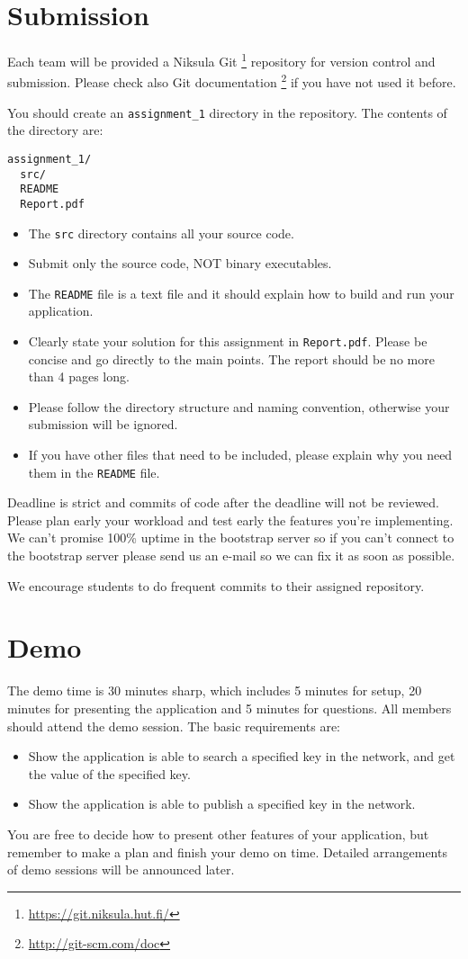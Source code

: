 \documentclass[12pt, a4paper]{article}
\begin{document}
\section{Submission}
Each team will be provided a Niksula Git \footnote{\url{https://git.niksula.hut.fi/}} repository for version control and submission.
Please check also Git documentation \footnote{\url{http://git-scm.com/doc}} if you have not used it before.

You should create an \texttt{assignment\_1} directory in the repository.
The contents of the directory are:
\begin{verbatim}
assignment_1/
  src/
  README
  Report.pdf
\end{verbatim}

\begin{itemize}
\item The \texttt{src} directory contains all your source code.
\item Submit only the source code, NOT binary executables.
\item The \texttt{README} file is a text file and it should explain how to build and run your application.
\item Clearly state your solution for this assignment in \texttt{Report.pdf}. Please be concise and go directly to the main points. The report should be no more than 4 pages long.
\item Please follow the directory structure and naming convention, otherwise your submission will be ignored.
\item If you have other files that need to be included, please explain why you need them in the \texttt{README} file.
\end{itemize}

Deadline is strict and commits of code after the deadline will not be reviewed. Please plan early your workload and test early the features you're implementing. We can't promise 100\% uptime in the bootstrap server so if you can't connect to the bootstrap server please send us an e-mail so we can fix it as soon as possible.

We encourage students to do frequent commits to their assigned repository.
\section{Demo}
The demo time is 30 minutes sharp, which includes 5 minutes for setup, 20 minutes for presenting the application and 5 minutes for questions.
All members should attend the demo session.
The basic requirements are:
\begin{itemize}
\item Show the application is able to search a specified key in the network, and get the value of the specified key.
\item Show the application is able to publish a specified key in the network.
\end{itemize}
You are free to decide how to present other features of your application, but remember to make a plan and finish your demo on time.
Detailed arrangements of demo sessions will be announced later.
\end{document}

